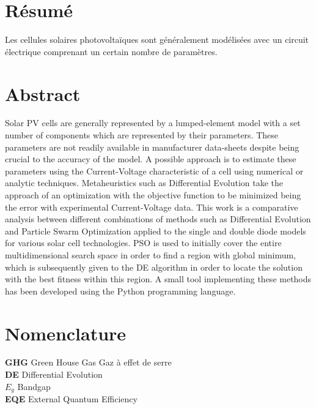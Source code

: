 \section*{Résumé}
Les cellules solaires photovoltaïques sont généralement modélisées avec un circuit électrique comprenant un certain nombre de paramètres.

\section*{Abstract}
Solar PV cells are generally represented by a lumped-element model with a set number of components which are represented by their parameters. These parameters are not readily available in manufacturer data-sheets despite being crucial to the accuracy of the model. A possible approach is to estimate these parameters using the Current-Voltage characteristic of a cell using numerical or analytic techniques. Metaheuristics such as Differential Evolution take the approach of an optimization with the objective function to be minimized being the error with experimental Current-Voltage data. This work is a comparative analysis between different combinations of methods such as Differential Evolution and Particle Swarm Optimization applied to the single and double diode models for various solar cell technologies. PSO is used to initially cover the entire multidimensional search space in order to find a region with global minimum, which is subsequently given to the DE algorithm in order to locate the solution with the best fitness within this region. A small tool implementing these methods has been developed using the Python programming language.

\section*{Nomenclature}
\noindent\textbf{GHG} \hfill Green House Gas \hfill Gaz à effet de serre\\
\textbf{DE} \hfill Differential Evolution \hfill \phantom{}\\
\textbf{$E_g$} \hfill Bandgap\\
\textbf{EQE} \hfill External Quantum Efficiency\\

\newpage
\tableofcontents
\newpage


